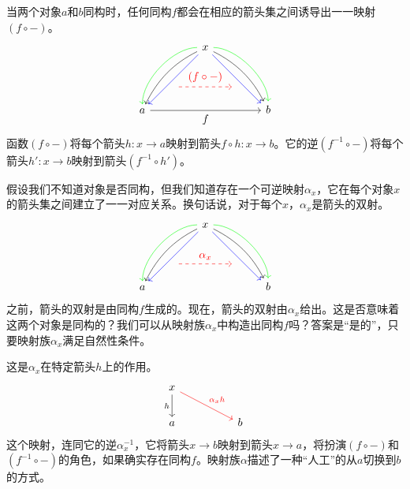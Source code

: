 \documentclass[DaoFP]{subfiles}
\begin{document}
当两个对象$a$和$b$同构时，任何同构$f$都会在相应的箭头集之间诱导出一一映射$(f \circ -)$。  
\[
 \begin{tikzcd}
 \node(x) at (0, 2) {x};
 \node(a) at (-2, 0) {a};
 \node(b) at (2, 0) {b};
 \node(c1) at (-1, 1.5) {};
 \node(c2) at (-1.5, 1) {};
 \node(c3) at (-1, 2) {};
 \node(c4) at (-2, 1) {};
 \node(d1) at (1, 1.5) {};
 \node(d2) at (1.5, 1) {};
 \node(d3) at (1, 2) {};
 \node(d4) at (2, 1) {};
\node (aa) at (-1, 0.75) {};
 \node (bb) at (1, 0.75) {};
 \draw[->] (x) .. controls (c1)  and (c2) .. (a); %
 \draw[->, green] (x) .. controls (c3)  and (c4) .. (a); %
 \draw[->, blue] (x) -- (a); 
  \draw[->] (x) .. controls (d1)  and (d2) .. (b); %
 \draw[->, green] (x) .. controls (d3)  and (d4) .. (b); %
 \draw[->, blue] (x) -- (b); 
 \draw[->, red, dashed] (aa) -- node[above]{(f \circ -)} (bb);
\draw[->] (a) -- node[below]{f} (b);
 \end{tikzcd}
\]
函数$(f \circ -)$将每个箭头$h \colon x \to a$映射到箭头$f \circ h \colon x \to b$。它的逆$(f^{-1} \circ -)$将每个箭头$h' \colon x \to b$映射到箭头$(f^{-1} \circ h')$。

假设我们不知道对象是否同构，但我们知道存在一个可逆映射$\alpha_x$，它在每个对象$x$的箭头集之间建立了一一对应关系。换句话说，对于每个$x$，$\alpha_x$是箭头的双射。 
\[
 \begin{tikzcd}
 \node(x) at (0, 2) {x};
 \node(a) at (-2, 0) {a};
 \node(b) at (2, 0) {b};
 \node(c1) at (-1, 1.5) {};
 \node(c2) at (-1.5, 1) {};
 \node(c3) at (-1, 2) {};
 \node(c4) at (-2, 1) {};
 \node(d1) at (1, 1.5) {};
 \node(d2) at (1.5, 1) {};
 \node(d3) at (1, 2) {};
 \node(d4) at (2, 1) {};
\node (aa) at (-1, 0.75) {};
 \node (bb) at (1, 0.75) {};
 \draw[->] (x) .. controls (c1)  and (c2) .. (a); %
 \draw[->, green] (x) .. controls (c3)  and (c4) .. (a); %
 \draw[->, blue] (x) -- (a); 
  \draw[->] (x) .. controls (d1)  and (d2) .. (b); %
 \draw[->, green] (x) .. controls (d3)  and (d4) .. (b); %
 \draw[->, blue] (x) -- (b); 
 \draw[->, red, dashed] (aa) -- node[above]{\alpha_x} (bb);
 \end{tikzcd}
\]
之前，箭头的双射是由同构$f$生成的。现在，箭头的双射由$\alpha_x$给出。这是否意味着这两个对象是同构的？我们可以从映射族$\alpha_x$中构造出同构$f$吗？答案是“是的”，只要映射族$\alpha_x$满足自然性条件。

这是$\alpha_x$在特定箭头$h$上的作用。 
\[
 \begin{tikzcd}
 x
 \arrow[d, "h"']
 \arrow[rrd, red, "\alpha_x h"]
  \\
 a
  && b
 \end{tikzcd}
\]
这个映射，连同它的逆$\alpha^{-1}_x$，它将箭头$x \to b$映射到箭头$x \to a$，将扮演$(f \circ -)$和$(f^{-1} \circ -)$的角色，如果确实存在同构$f$。映射族$\alpha$描述了一种“人工”的从$a$切换到$b$的方式。
\end{document}

